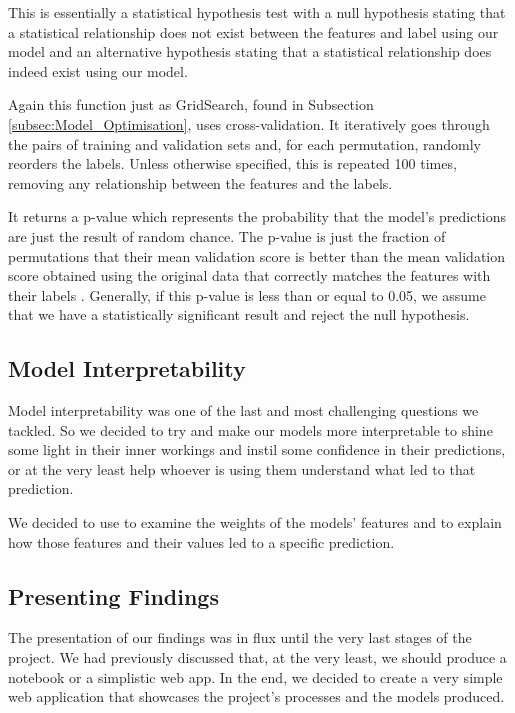 This is essentially a statistical hypothesis test with a null hypothesis stating that a statistical relationship does not exist between the features and label using our model and an alternative hypothesis stating that a statistical relationship does indeed exist using our model.

Again this function just as GridSearch, found in Subsection \ref{subsec:Model_Optimisation}, uses cross-validation. It iteratively goes through the pairs of training and validation sets and, for each permutation, randomly reorders the labels. Unless otherwise specified, this is repeated 100 times, removing any relationship between the features and the labels.

It returns a p-value which represents the probability that the model's predictions are just the result of random chance. The p-value is just the fraction of permutations that their mean validation score is better than the mean validation score obtained using the original data that correctly matches the features with their labels \citep{Permutation_Test_Score_Explanation}. Generally, if this p-value is less than or equal to 0.05, we assume that we have a statistically significant result and reject the null hypothesis.

\subsection{Model Interpretability}
\label{subsec:Interpretability}

Model interpretability was one of the last and most challenging questions we tackled. So we decided to try and make our models more interpretable to shine some light in their inner workings and instil some confidence in their predictions, or at the very least help whoever is using them understand what led to that prediction.

We decided to use \citet{ELI5} to examine the weights of the models' features and \citet{LIME} to explain how those features and their values led to a specific prediction.

\subsection{Presenting Findings}

The presentation of our findings was in flux until the very last stages of the project. We had previously discussed that, at the very least, we should produce a notebook or a simplistic web app. In the end, we decided to create a very simple \citet{Streamlit} web application that showcases the project's processes and the models produced.

